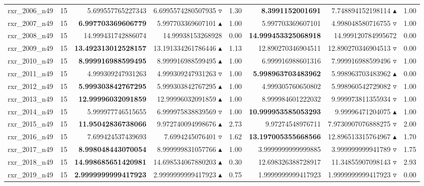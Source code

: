 \begin{table}[]
{\begin{tabular}{ll@{\hspace{1.2cm}}rrr@{\hspace{1.2cm}}rrr}
rxr_2006_n49 & 15 & 5.699557765227343 & 6.6995574280507935 $\triangledown$ & 1.30 & \textbf{8.3991152001691} & 7.748894152198114 $\blacktriangle$ & 1.00 \\
rxr_2007_n49 & 15 & \textbf{6.997703369606779} & 5.997703369607101 $\blacktriangle$ & 1.00 & 5.997703369607101 & 4.998048580716755 $\triangledown$ & 1.00 \\
rxr_2008_n49 & 15 & 14.999431742886074 & 14.99938153268928 \phantom{$\blacktriangle$} & 0.00 & \textbf{14.999453325068918} & 14.999120784995672 \phantom{$\blacktriangle$} & 0.00 \\
rxr_2009_n49 & 15 & \textbf{13.492313012528157} & 13.191334261786446 $\blacktriangle$ & 1.13 & 12.890270346904511 & 12.890270346904513 $\triangledown$ & 0.00 \\
rxr_2010_n49 & 15 & \textbf{8.999916988599495} & 8.999916988599495 $\blacktriangle$ & 1.00 & 6.999916988601316 & 7.999916988599496 $\triangledown$ & 1.00 \\
rxr_2011_n49 & 15 & 4.999309247931263 & 4.999309247931263 $\triangledown$ & 1.00 & \textbf{5.998963703483962} & 5.998963703483962 $\blacktriangle$ & 0.00 \\
rxr_2012_n49 & 15 & \textbf{5.999303842767295} & 5.999303842767295 $\blacktriangle$ & 1.00 & 4.999305760650802 & 5.998960542729082 $\triangledown$ & 1.00 \\
rxr_2013_n49 & 15 & \textbf{12.99996032091859} & 12.99996032091859 $\blacktriangle$ & 1.00 & 8.999984601222032 & 9.999973811355934 $\triangledown$ & 1.00 \\
rxr_2014_n49 & 15 & 5.999977746515655 & 6.999975838839569 $\triangledown$ & 1.00 & \textbf{10.999953585053293} & 9.99996471204075 $\blacktriangle$ & 1.00 \\
rxr_2015_n49 & 15 & \textbf{11.95042836738066} & 9.972740094998676 $\blacktriangle$ & 2.73 & 9.97274548976711 & 7.9730907076888275 $\triangledown$ & 2.00 \\
rxr_2016_n49 & 15 & 7.699424537439693 & 7.6994245076401 $\triangledown$ & 1.62 & \textbf{13.197005355668566} & 12.896513315764967 $\blacktriangle$ & 1.70 \\
rxr_2017_n49 & 15 & \textbf{8.998048443070054} & 8.999999831057766 $\blacktriangle$ & 1.00 & 3.9999999999999885 & 3.999999999941789 $\triangledown$ & 1.75 \\
rxr_2018_n49 & 15 & \textbf{14.998685651420981} & 14.698534067880203 $\blacktriangle$ & 0.30 & 12.698326388728917 & 11.34855907098143 $\triangledown$ & 2.93 \\
rxr_2019_n49 & 15 & \textbf{2.9999999999417923} & 2.9999999999417923 $\blacktriangle$ & 0.75 & 1.9999999999417923 & 1.9999999999417923 $\triangledown$ & 0.00 \\

\end{tabular}}
\end{table}
